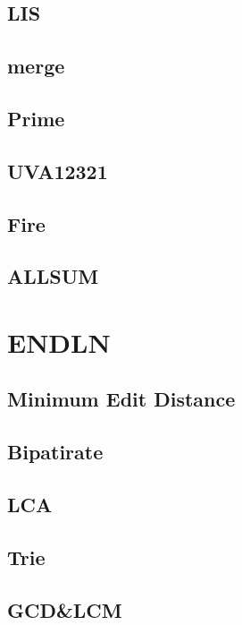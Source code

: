     \subsection{LIS}
        
    \subsection{merge}
          
    \subsection{Prime}
        
    \subsection{UVA12321}
        
    \subsection{Fire}
        
    \subsection{ALLSUM}
        

\section{ENDLN}
    \subsection{Minimum Edit Distance}
        
    \subsection{Bipatirate}
        
    \subsection{LCA}
        
    \subsection{Trie}
        
    \subsection{GCD&LCM}
        
    
